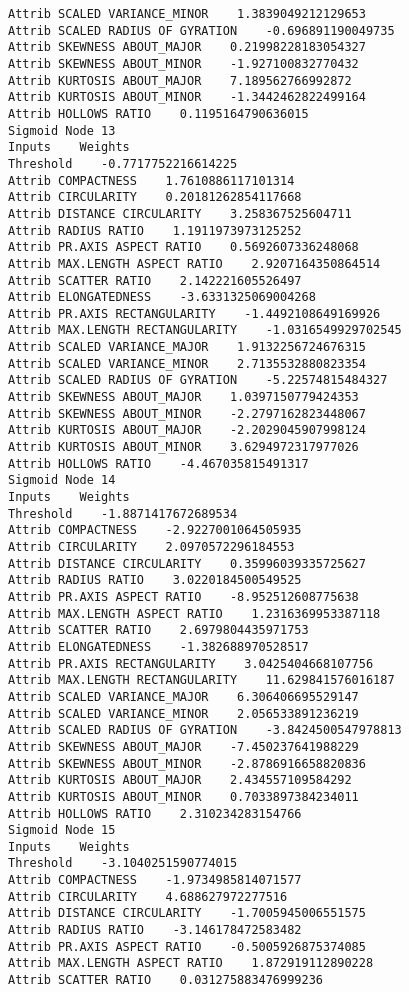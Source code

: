 \documentclass[
	article,			%
	11pt,				%
	oneside,			%
	a4paper,			%
	english,			%
	brazil,				%
	sumario=tradicional
	]{abntex2}
\begin{document}
\begin{lstlisting}
Attrib SCALED VARIANCE_MINOR    1.3839049212129653
Attrib SCALED RADIUS OF GYRATION    -0.696891190049735
Attrib SKEWNESS ABOUT_MAJOR    0.21998228183054327
Attrib SKEWNESS ABOUT_MINOR    -1.927100832770432
Attrib KURTOSIS ABOUT_MAJOR    7.189562766992872
Attrib KURTOSIS ABOUT_MINOR    -1.3442462822499164
Attrib HOLLOWS RATIO    0.1195164790636015
Sigmoid Node 13
Inputs    Weights
Threshold    -0.7717752216614225
Attrib COMPACTNESS    1.7610886117101314
Attrib CIRCULARITY    0.20181262854117668
Attrib DISTANCE CIRCULARITY    3.258367525604711
Attrib RADIUS RATIO    1.1911973973125252
Attrib PR.AXIS ASPECT RATIO    0.5692607336248068
Attrib MAX.LENGTH ASPECT RATIO    2.9207164350864514
Attrib SCATTER RATIO    2.142221605526497
Attrib ELONGATEDNESS    -3.6331325069004268
Attrib PR.AXIS RECTANGULARITY    -1.4492108649169926
Attrib MAX.LENGTH RECTANGULARITY    -1.0316549929702545
Attrib SCALED VARIANCE_MAJOR    1.9132256724676315
Attrib SCALED VARIANCE_MINOR    2.7135532880823354
Attrib SCALED RADIUS OF GYRATION    -5.22574815484327
Attrib SKEWNESS ABOUT_MAJOR    1.0397150779424353
Attrib SKEWNESS ABOUT_MINOR    -2.2797162823448067
Attrib KURTOSIS ABOUT_MAJOR    -2.2029045907998124
Attrib KURTOSIS ABOUT_MINOR    3.6294972317977026
Attrib HOLLOWS RATIO    -4.467035815491317
Sigmoid Node 14
Inputs    Weights
Threshold    -1.8871417672689534
Attrib COMPACTNESS    -2.9227001064505935
Attrib CIRCULARITY    2.0970572296184553
Attrib DISTANCE CIRCULARITY    0.35996039335725627
Attrib RADIUS RATIO    3.0220184500549525
Attrib PR.AXIS ASPECT RATIO    -8.952512608775638
Attrib MAX.LENGTH ASPECT RATIO    1.2316369953387118
Attrib SCATTER RATIO    2.6979804435971753
Attrib ELONGATEDNESS    -1.382688970528517
Attrib PR.AXIS RECTANGULARITY    3.0425404668107756
Attrib MAX.LENGTH RECTANGULARITY    11.629841576016187
Attrib SCALED VARIANCE_MAJOR    6.306406695529147
Attrib SCALED VARIANCE_MINOR    2.056533891236219
Attrib SCALED RADIUS OF GYRATION    -3.8424500547978813
Attrib SKEWNESS ABOUT_MAJOR    -7.450237641988229
Attrib SKEWNESS ABOUT_MINOR    -2.8786916658820836
Attrib KURTOSIS ABOUT_MAJOR    2.434557109584292
Attrib KURTOSIS ABOUT_MINOR    0.7033897384234011
Attrib HOLLOWS RATIO    2.310234283154766
Sigmoid Node 15
Inputs    Weights
Threshold    -3.1040251590774015
Attrib COMPACTNESS    -1.9734985814071577
Attrib CIRCULARITY    4.688627972277516
Attrib DISTANCE CIRCULARITY    -1.7005945006551575
Attrib RADIUS RATIO    -3.146178472583482
Attrib PR.AXIS ASPECT RATIO    -0.5005926875374085
Attrib MAX.LENGTH ASPECT RATIO    1.872919112890228
Attrib SCATTER RATIO    0.031275883476999236

\end{lstlisting}
\end{document}
